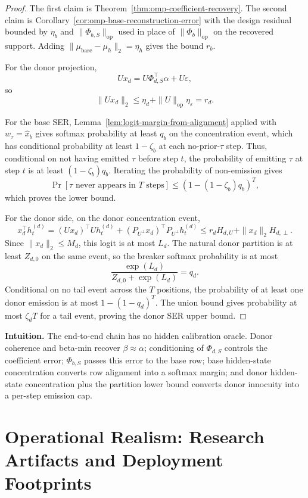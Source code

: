\documentclass{article}
\theoremstyle{plain}
\theoremstyle{definition}
\theoremstyle{remark}
\begin{document}
\begin{proof}
The first claim is Theorem~\ref{thm:omp-coefficient-recovery}. The second claim is Corollary~\ref{cor:omp-base-reconstruction-error} with the design residual bounded by $\eta_b$ and $\|\Phi_{b,S}\|_{\mathrm{op}}$ used in place of $\|\Phi_b\|_{\mathrm{op}}$ on the recovered support. Adding $\|\mu_{\text{base}}-\mu_h\|_2=\eta_h$ gives the bound $r_b$.

For the donor projection,
\[
Ux_d=U\Phi_{d,S}^\top\alpha+U\varepsilon,
\]
so
\[
\|Ux_d\|_2
\le
\eta_d+\|U\|_{\mathrm{op}}\eta_\varepsilon
=r_d.
\]

For the base SER, Lemma~\ref{lem:logit-margin-from-alignment} applied with $w_\tau=\widehat{x}_b$ gives softmax probability at least $q_b$ on the concentration event, which has conditional probability at least $1-\zeta_b$ at each no-prior-$\tau$ step. Thus, conditional on not having emitted $\tau$ before step $t$, the probability of emitting $\tau$ at step $t$ is at least $(1-\zeta_b)q_b$. Iterating the probability of non-emission gives
\[
\Pr[\tau\text{ never appears in }T\text{ steps}]
\le
\left(1-(1-\zeta_b)q_b\right)^T,
\]
which proves the lower bound.

For the donor side, on the donor concentration event,
\[
x_d^\top h_t^{(d)}
=
(Ux_d)^\top Uh_t^{(d)}+(P_{U^\perp}x_d)^\top P_{U^\perp}h_t^{(d)}
\le
r_dH_{d,U}+\|x_d\|_2H_{d,\perp}.
\]
Since $\|x_d\|_2\le M_d$, this logit is at most $L_d$. The natural donor partition is at least $Z_{d,0}$ on the same event, so the breaker softmax probability is at most
\[
\frac{\exp(L_d)}{Z_{d,0}+\exp(L_d)}=q_d.
\]
Conditional on no tail event across the $T$ positions, the probability of at least one donor emission is at most $1-(1-q_d)^T$. The union bound gives probability at most $\zeta_d T$ for a tail event, proving the donor SER upper bound.
\end{proof}

\noindent\textbf{Intuition.}
The end-to-end chain has no hidden calibration oracle. Donor coherence and beta-min recover $\beta\approx\alpha$; conditioning of $\Phi_{d,S}$ controls the coefficient error; $\Phi_{b,S}$ passes this error to the base row; base hidden-state concentration converts row alignment into a softmax margin; and donor hidden-state concentration plus the partition lower bound converts donor innocuity into a per-step emission cap.



\section{Operational Realism: Research Artifacts and Deployment Footprints}
\label{app:operational_stealth}
\end{document}
